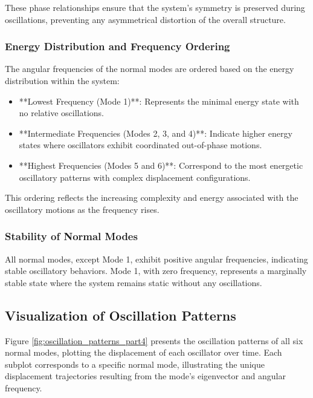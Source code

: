 \documentclass[12pt]{report} %
\begin{document}
These phase relationships ensure that the system's symmetry is preserved during oscillations, preventing any asymmetrical distortion of the overall structure.

\subsubsection{Energy Distribution and Frequency Ordering}
\label{subsubsec:part4_energy_distribution}

The angular frequencies of the normal modes are ordered based on the energy distribution within the system:

\begin{itemize}
    \item **Lowest Frequency (Mode 1)**: Represents the minimal energy state with no relative oscillations.
    \item **Intermediate Frequencies (Modes 2, 3, and 4)**: Indicate higher energy states where oscillators exhibit coordinated out-of-phase motions.
    \item **Highest Frequencies (Modes 5 and 6)**: Correspond to the most energetic oscillatory patterns with complex displacement configurations.
\end{itemize}

This ordering reflects the increasing complexity and energy associated with the oscillatory motions as the frequency rises.

\subsubsection{Stability of Normal Modes}
\label{subsubsec:part4_mode_stability}

All normal modes, except Mode 1, exhibit positive angular frequencies, indicating stable oscillatory behaviors. Mode 1, with zero frequency, represents a marginally stable state where the system remains static without any oscillations.

\subsection{Visualization of Oscillation Patterns}
\label{subsec:part4_visualization}

Figure \ref{fig:oscillation_patterns_part4} presents the oscillation patterns of all six normal modes, plotting the displacement of each oscillator over time. Each subplot corresponds to a specific normal mode, illustrating the unique displacement trajectories resulting from the mode's eigenvector and angular frequency.
\end{document}
